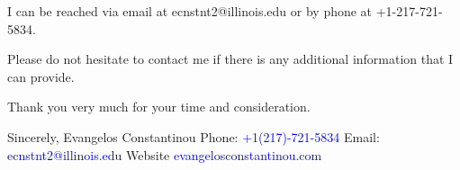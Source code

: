 \documentclass[12pt]{letter}
\begin{document}
\begin{letter}{}





I can be reached via email at ecnstnt2@illinois.edu or by phone at +1-217-721-5834.

Please do not hesitate to contact me if there is any additional information that I can provide.

Thank you very much for your time and consideration.


\noindent Sincerely,
\newline\noindent Evangelos Constantinou
\vspace{4mm}
\newline\noindent Phone: \textcolor{blue}{+1(217)-721-5834}
\newline\noindent Email: \textcolor{blue}{ecnstnt2@illinois.edu}
\newline\noindent Website \textcolor{blue}{evangelosconstantinou.com}
\end{letter}
\end{document}
